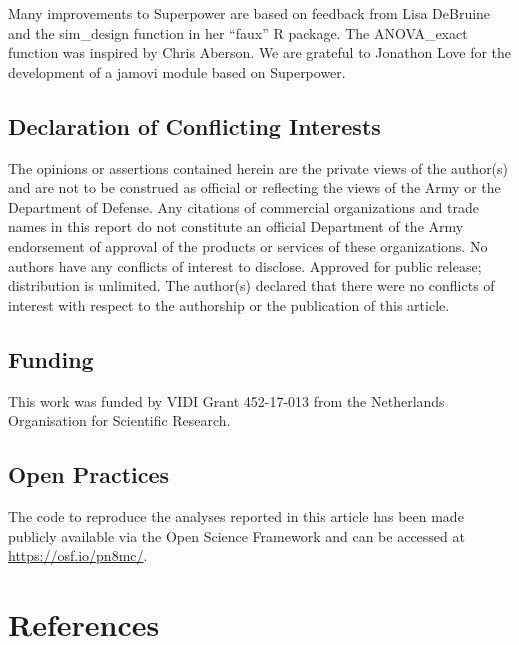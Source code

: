\documentclass[
  ,jou,floatsintext]{apa6}
\begin{document}
Many improvements to Superpower are based on feedback from Lisa DeBruine and the sim\_design function in her \enquote{faux} R package. The ANOVA\_exact function was inspired by Chris Aberson. We are grateful to Jonathon Love for the development of a jamovi module based on Superpower.

\hypertarget{declaration-of-conflicting-interests}{%
\subsection{Declaration of Conflicting Interests}\label{declaration-of-conflicting-interests}}

The opinions or assertions contained herein are the private views of the author(s) and are not to be construed as official or reflecting the views of the Army or the Department of Defense. Any citations of commercial organizations and trade names in this report do not constitute an official Department of the Army endorsement of approval of the products or services of these organizations. No authors have any conflicts of interest to disclose. Approved for public release; distribution is unlimited. The author(s) declared that there were no conflicts of interest with respect to the authorship or the publication of this article.

\hypertarget{funding}{%
\subsection{Funding}\label{funding}}

This work was funded by VIDI Grant 452-17-013 from the Netherlands Organisation for Scientific Research.

\hypertarget{open-practices}{%
\subsection{Open Practices}\label{open-practices}}

The code to reproduce the analyses reported in this article has been made publicly available via the Open Science Framework and can be accessed at \url{https://osf.io/pn8mc/}.

\hypertarget{references}{%
\section{References}\label{references}}

\setlength{\parindent}{-0.5in}
\setlength{\leftskip}{0.5in}
\end{document}
